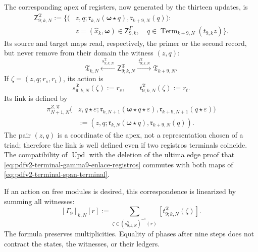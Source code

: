 The corresponding apex of registers, now generated by the thirteen updates, is
\begin{equation}
\label{eq:pdfv2-terminal-apice-terminal-gamma9}
 \begin{split}
 \mathsf Z^{\mathfrak T}_{9;k,N}:=\bigl\{
 (&z,q;
   \mathfrak r_{k,N}(\boldsymbol\omega\star q),
   \mathfrak r_{k+9,N}(q)):\\
 &z=(\widehat x_k,\boldsymbol\omega)\in
       \mathsf Z^\Gamma_{9,k},\quad
 q\in\operatorname{Term}_{k+9,N}(t_{9,k}z)
 \bigr\}.
 \end{split}
\end{equation}
Its source and target maps read, respectively, the primer or the second
record, but never remove from their domain the witness \((z,q)\):
\begin{equation}
\label{eq:pdfv2-terminal-span-terminal}
 \mathfrak T_{k,N}
 \xleftarrow{\ s^{\mathfrak T}_{9;k,N}\ }
 \mathsf Z^{\mathfrak T}_{9;k,N}
 \xrightarrow{\ t^{\mathfrak T}_{9;k,N}\ }
 \mathfrak T_{k+9,N}.
\end{equation}
If \(\zeta=(z,q;r_s,r_t)\), its action is
\begin{equation}
\label{eq:pdfv2-terminal-span-terminal-accion}
 s^{\mathfrak T}_{9;k,N}(\zeta):=r_s,
 \qquad
 t^{\mathfrak T}_{9;k,N}(\zeta):=r_t.
\end{equation}
Its link is defined by
\begin{equation}
\label{eq:pdfv2-terminal-gamma9-enlace-registros}
 \begin{split}
 \pi^{Z,\mathfrak T}_{N+1,N}
 \bigl(&z,q\star\varepsilon;
       \mathfrak r_{k,N+1}
          (\boldsymbol\omega\star q\star\varepsilon),
       \mathfrak r_{k+9,N+1}(q\star\varepsilon)\bigr)\\
 &:=(z,q;\mathfrak r_{k,N}(\boldsymbol\omega\star q),
       \mathfrak r_{k+9,N}(q)).
 \end{split}
\end{equation}
The pair \((z,q)\) is a coordinate of the apex, not a representation
chosen of a triad; therefore the link is well defined even if two
registros terminals coincide. The compatibility of
\(\operatorname{Upd}\) with the deletion of the ultima edge proof that
\eqref{eq:pdfv2-terminal-gamma9-enlace-registros} commutes with both maps of
\eqref{eq:pdfv2-terminal-span-terminal}.

If an action on free modules is desired, this
correspondence is linearized by summing all witnesses:
\begin{equation}
\label{eq:pdfv2-terminal-linealizacion-span}
 [\Gamma_9]_{k,N}[r]
 :=\sum_{\zeta\in(s^{\mathfrak T}_{9;k,N})^{-1}(r)}
 [t^{\mathfrak T}_{9;k,N}(\zeta)].
\end{equation}
The formula preserves multiplicities. Equality of phases after
nine steps does not contract the states, the witnesses, or their ledgers.

